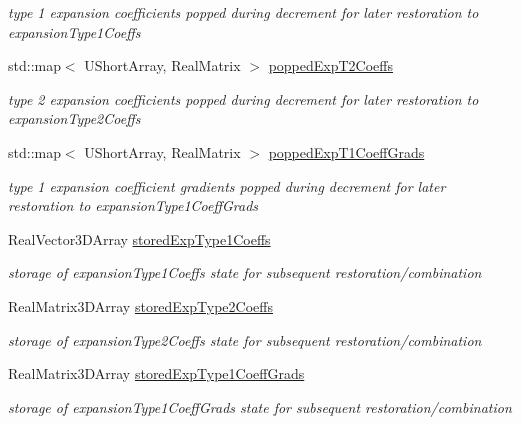 \begin{DoxyCompactItemize}
\begin{DoxyCompactList}\small\item\em type 1 expansion coefficients popped during decrement for later restoration to expansion\+Type1\+Coeffs \end{DoxyCompactList}\item 
std\+::map$<$ U\+Short\+Array, Real\+Matrix $>$ \hyperlink{classPecos_1_1HierarchInterpPolyApproximation_a138110bf58dca9e55b2fc0abc118b6bb}{popped\+Exp\+T2\+Coeffs}\label{classPecos_1_1HierarchInterpPolyApproximation_a138110bf58dca9e55b2fc0abc118b6bb}

\begin{DoxyCompactList}\small\item\em type 2 expansion coefficients popped during decrement for later restoration to expansion\+Type2\+Coeffs \end{DoxyCompactList}\item 
std\+::map$<$ U\+Short\+Array, Real\+Matrix $>$ \hyperlink{classPecos_1_1HierarchInterpPolyApproximation_ad39893a46b390e0dc8957f86c18dba47}{popped\+Exp\+T1\+Coeff\+Grads}\label{classPecos_1_1HierarchInterpPolyApproximation_ad39893a46b390e0dc8957f86c18dba47}

\begin{DoxyCompactList}\small\item\em type 1 expansion coefficient gradients popped during decrement for later restoration to expansion\+Type1\+Coeff\+Grads \end{DoxyCompactList}\item 
Real\+Vector3\+D\+Array \hyperlink{classPecos_1_1HierarchInterpPolyApproximation_acaba84a6c4e25d925617fc82b662f7af}{stored\+Exp\+Type1\+Coeffs}\label{classPecos_1_1HierarchInterpPolyApproximation_acaba84a6c4e25d925617fc82b662f7af}

\begin{DoxyCompactList}\small\item\em storage of expansion\+Type1\+Coeffs state for subsequent restoration/combination \end{DoxyCompactList}\item 
Real\+Matrix3\+D\+Array \hyperlink{classPecos_1_1HierarchInterpPolyApproximation_a400f3324a19bd61b57380766e71c99c0}{stored\+Exp\+Type2\+Coeffs}\label{classPecos_1_1HierarchInterpPolyApproximation_a400f3324a19bd61b57380766e71c99c0}

\begin{DoxyCompactList}\small\item\em storage of expansion\+Type2\+Coeffs state for subsequent restoration/combination \end{DoxyCompactList}\item 
Real\+Matrix3\+D\+Array \hyperlink{classPecos_1_1HierarchInterpPolyApproximation_af1dd1b18eb871672957c24c6daa46a27}{stored\+Exp\+Type1\+Coeff\+Grads}\label{classPecos_1_1HierarchInterpPolyApproximation_af1dd1b18eb871672957c24c6daa46a27}

\begin{DoxyCompactList}\small\item\em storage of expansion\+Type1\+Coeff\+Grads state for subsequent restoration/combination \end{DoxyCompactList}\end{DoxyCompactItemize}
